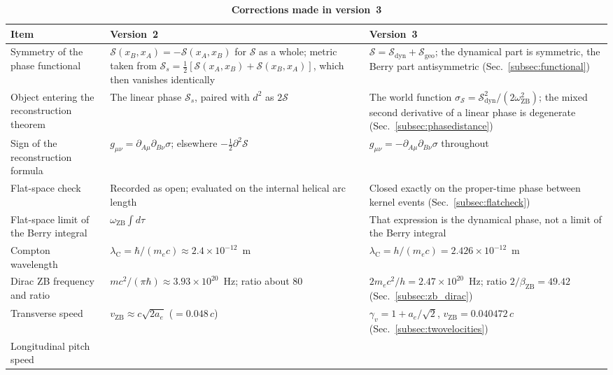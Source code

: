 \documentclass[%
 reprint, amsmath,amssymb, aps, prb, ]{revtex4-2}
\numberwithin{equation}{section}
\newcommand{\omZB}{\omega_{\text{ZB}}}
\newcommand{\lambdaC}{\lambda_{\mathrm{C}}}
\begin{document}
\begin{table}[t!]
\centering
\caption{\textbf{Corrections made in version~3}}
\label{tab:v3corrections}
\renewcommand{\arraystretch}{1.4}
\begin{tabular}{p{4.6cm}p{5.4cm}p{5.5cm}}
\toprule
\textbf{Item} & \textbf{Version~2} & \textbf{Version~3} \\
\midrule
Symmetry of the phase functional
& $\mathcal{S}(x_B,x_A) = -\mathcal{S}(x_A,x_B)$ for $\mathcal{S}$ as a whole; metric taken from $\mathcal{S}_s = \tfrac12[\mathcal{S}(x_A,x_B)+\mathcal{S}(x_B,x_A)]$, which then vanishes identically
& $\mathcal{S} = \mathcal{S}_{\mathrm{dyn}} + \mathcal{S}_{\mathrm{geo}}$; the dynamical part is symmetric, the Berry part antisymmetric (Sec.~\ref{subsec:functional}) \\
\addlinespace[0.3cm]
Object entering the reconstruction theorem
& The linear phase $\mathcal{S}_s$, paired with $d^2$ as $2\mathcal{S}$
& The world function $\sigma_{\mathcal{S}} = \mathcal{S}_{\mathrm{dyn}}^2/(2\omZB^2)$; the mixed second derivative of a linear phase is degenerate (Sec.~\ref{subsec:phasedistance}) \\
\addlinespace[0.3cm]
Sign of the reconstruction formula
& $g_{\mu\nu} = \partial_{A\mu}\partial_{B\nu}\sigma$; elsewhere $-\tfrac12\partial^2\mathcal{S}$
& $g_{\mu\nu} = -\partial_{A\mu}\partial_{B\nu}\sigma$ throughout \\
\addlinespace[0.3cm]
Flat-space check
& Recorded as open; evaluated on the internal helical arc length
& Closed exactly on the proper-time phase between kernel events (Sec.~\ref{subsec:flatcheck}) \\
\addlinespace[0.3cm]
Flat-space limit of the Berry integral
& $\omZB\int d\tau$
& That expression is the dynamical phase, not a limit of the Berry integral \\
\addlinespace[0.3cm]
Compton wavelength
& $\lambdaC = \hbar/(m_ec) \approx 2.4\times10^{-12}$~m
& $\lambdaC = h/(m_ec) = 2.426\times10^{-12}$~m \\
\addlinespace[0.3cm]
Dirac ZB frequency and ratio
& $mc^2/(\pi\hbar) \approx 3.93\times10^{20}$~Hz; ratio about $80$
& $2m_ec^2/h = 2.47\times10^{20}$~Hz; ratio $2/\beta_{\mathrm{ZB}} = 49.42$ (Sec.~\ref{subsec:zb_dirac}) \\
\addlinespace[0.3cm]
Transverse speed
& $v_{\mathrm{ZB}} \approx c\sqrt{2a_e}$ ($= 0.048\,c$)
& $\gamma_v = 1 + a_e/\sqrt{2}$, $v_{\mathrm{ZB}} = 0.040472\,c$ (Sec.~\ref{subsec:twovelocities}) \\
\addlinespace[0.3cm]
Longitudinal pitch speed

\end{tabular}
\end{table}
\end{document}
